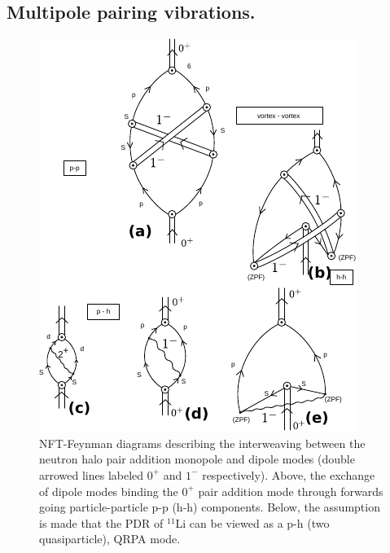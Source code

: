 \begin{subappendices}
\section{Multipole pairing vibrations.}\label{App6G}
\begin{figure}
\includegraphics[width=\textwidth]{C8/figsC8/figA1_corr.pdf}
\caption{ NFT-Feynman diagrams describing the interweaving between the neutron halo pair addition monopole and dipole modes
(double arrowed lines labeled $0^+$ and $1^-$ respectively). Above, the exchange of dipole modes binding the $0^+$ pair addition mode through  forwards going particle-particle p-p (h-h) components. Below,  the assumption is made that the PDR of $^{11}$Li can be viewed as a p-h (two quasiparticle), QRPA mode.}\label{fig6.I.1}
\end{figure}


\end{subappendices}
